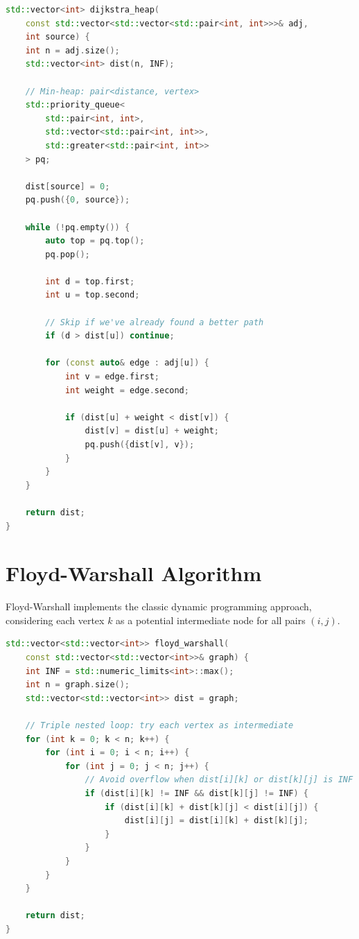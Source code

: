 \documentclass[12pt, a4paper]{report}
\begin{document}
\begin{lstlisting}[language=C++, caption={Heap-based Dijkstra implementation}]
std::vector<int> dijkstra_heap(
    const std::vector<std::vector<std::pair<int, int>>>& adj, 
    int source) {
    int n = adj.size();
    std::vector<int> dist(n, INF);
    
    // Min-heap: pair<distance, vertex>
    std::priority_queue<
        std::pair<int, int>, 
        std::vector<std::pair<int, int>>, 
        std::greater<std::pair<int, int>>
    > pq;
    
    dist[source] = 0;
    pq.push({0, source});
    
    while (!pq.empty()) {
        auto top = pq.top();
        pq.pop();
        
        int d = top.first;
        int u = top.second;
        
        // Skip if we've already found a better path
        if (d > dist[u]) continue;
        
        for (const auto& edge : adj[u]) {
            int v = edge.first;
            int weight = edge.second;
            
            if (dist[u] + weight < dist[v]) {
                dist[v] = dist[u] + weight;
                pq.push({dist[v], v});
            }
        }
    }
    
    return dist;
}
\end{lstlisting}

\newpage

\section{Floyd-Warshall Algorithm}

Floyd-Warshall implements the classic dynamic programming approach, considering each vertex $k$ as a potential intermediate node for all pairs $(i, j)$.

\begin{lstlisting}[language=C++, caption={Floyd-Warshall implementation}]
std::vector<std::vector<int>> floyd_warshall(
    const std::vector<std::vector<int>>& graph) {
    int INF = std::numeric_limits<int>::max();
    int n = graph.size();
    std::vector<std::vector<int>> dist = graph;
    
    // Triple nested loop: try each vertex as intermediate
    for (int k = 0; k < n; k++) {
        for (int i = 0; i < n; i++) {
            for (int j = 0; j < n; j++) {
                // Avoid overflow when dist[i][k] or dist[k][j] is INF
                if (dist[i][k] != INF && dist[k][j] != INF) {
                    if (dist[i][k] + dist[k][j] < dist[i][j]) {
                        dist[i][j] = dist[i][k] + dist[k][j];
                    }
                }
            }
        }
    }
    
    return dist;
}
\end{lstlisting}
\end{document}
